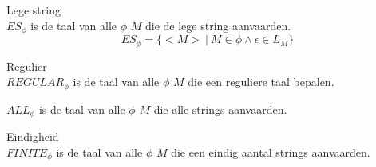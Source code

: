 \documentclass[main.tex]{subfiles}
\begin{document}
\begin{de}
  Lege string\\
  $ES_{\phi}$ is de taal van alle $\phi$ $M$ die de lege string aanvaarden.
  \[ ES_{\phi} = \{ <M> \ |\ M\in \phi \wedge \epsilon \in L_{M}\} \]
\end{de}

\begin{de}
  Regulier\\
  $REGULAR_{\phi}$ is de taal van alle $\phi$ $M$ die een reguliere taal bepalen.
\end{de}

\begin{de}
  $ALL_{\phi}$ is de taal van alle $\phi$ $M$ die alle strings aanvaarden.
\end{de}

\begin{de}
  Eindigheid\\
  $FINITE_{\phi}$ is de taal van alle $\phi$ $M$ die een eindig aantal strings aanvaarden.
\end{de}
\end{document}
